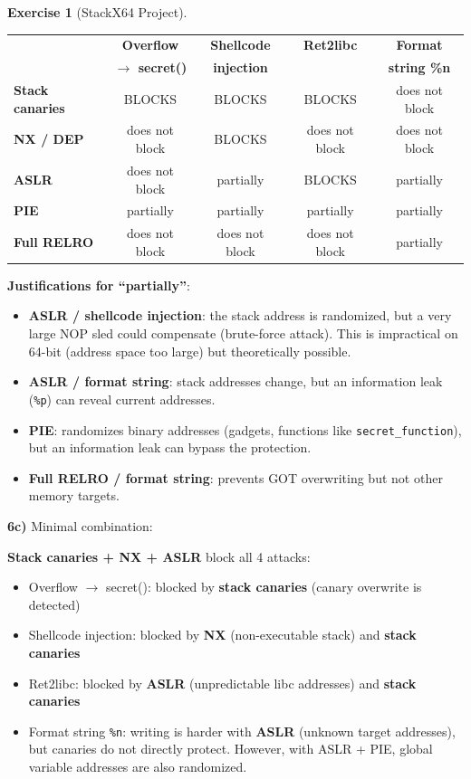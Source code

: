 \documentclass[a4paper,11pt]{article}
\theoremstyle{plain}
\theoremstyle{definition}
\newtheorem{exercice}{Exercise}
\begin{document}
\begin{exercice}[StackX64 Project]
\begin{correction}
\begin{center}
\begin{tabular}{l|c|c|c|c}
\toprule
& \textbf{Overflow} & \textbf{Shellcode} & \textbf{Ret2libc} & \textbf{Format} \\
& \textbf{$\to$ secret()} & \textbf{injection} & & \textbf{string \%n} \\
\midrule
\textbf{Stack canaries} & BLOCKS & BLOCKS & BLOCKS & does not block \\
\midrule
\textbf{NX / DEP} & does not block & BLOCKS & does not block & does not block \\
\midrule
\textbf{ASLR} & does not block & partially & BLOCKS & partially \\
\midrule
\textbf{PIE} & partially & partially & partially & partially \\
\midrule
\textbf{Full RELRO} & does not block & does not block & does not block & partially \\
\bottomrule
\end{tabular}
\end{center}

\textbf{Justifications for ``partially''}:
\begin{itemize}
    \item \textbf{ASLR / shellcode injection}: the stack address is randomized, but a very large NOP sled could compensate (brute-force attack). This is impractical on 64-bit (address space too large) but theoretically possible.
    \item \textbf{ASLR / format string}: stack addresses change, but an information leak (\texttt{\%p}) can reveal current addresses.
    \item \textbf{PIE}: randomizes binary addresses (gadgets, functions like \texttt{secret\_function}), but an information leak can bypass the protection.
    \item \textbf{Full RELRO / format string}: prevents GOT overwriting but not other memory targets.
\end{itemize}

\textbf{6c)} Minimal combination:

\textbf{Stack canaries + NX + ASLR} block all 4 attacks:
\begin{itemize}
    \item Overflow $\to$ secret(): blocked by \textbf{stack canaries} (canary overwrite is detected)
    \item Shellcode injection: blocked by \textbf{NX} (non-executable stack) and \textbf{stack canaries}
    \item Ret2libc: blocked by \textbf{ASLR} (unpredictable libc addresses) and \textbf{stack canaries}
    \item Format string \texttt{\%n}: writing is harder with \textbf{ASLR} (unknown target addresses), but canaries do not directly protect. However, with ASLR + PIE, global variable addresses are also randomized.
\end{itemize}


\end{correction}
\end{exercice}
\end{document}
